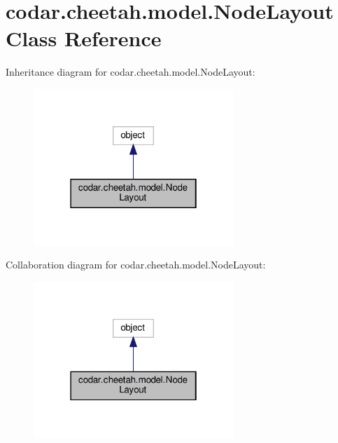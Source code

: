 \hypertarget{classcodar_1_1cheetah_1_1model_1_1_node_layout}{}\section{codar.\+cheetah.\+model.\+Node\+Layout Class Reference}
\label{classcodar_1_1cheetah_1_1model_1_1_node_layout}


Inheritance diagram for codar.\+cheetah.\+model.\+Node\+Layout\+:
\nopagebreak
\begin{figure}[H]
\begin{center}
\leavevmode
\includegraphics[width=214pt]{classcodar_1_1cheetah_1_1model_1_1_node_layout__inherit__graph}
\end{center}
\end{figure}


Collaboration diagram for codar.\+cheetah.\+model.\+Node\+Layout\+:
\nopagebreak
\begin{figure}[H]
\begin{center}
\leavevmode
\includegraphics[width=214pt]{classcodar_1_1cheetah_1_1model_1_1_node_layout__coll__graph}
\end{center}
\end{figure}
